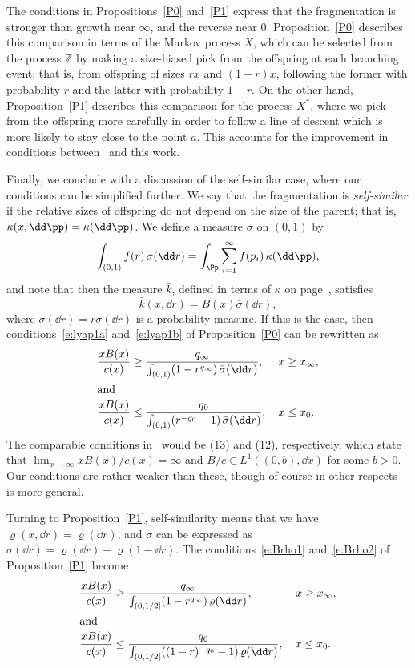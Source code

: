The conditions in Propositions~\ref{P0} and~\ref{P1} express that the fragmentation is stronger than growth near $\infty$, and the reverse near $0$. Proposition~\ref{P0} describes this comparison in terms of the Markov process $X$, which can be selected from the process $\mathbb{Z}$ by making a size-biased pick from the offspring at each branching event; that is, from offspring of sizes $rx$ and $(1-r)x$, following the former with probability $r$ and the latter with probability $1-r$. On the other hand, Proposition~\ref{P1} describes this comparison for the process $X^*$, where we pick from the offspring more carefully in order to follow a line of descent which is more likely to stay close to the point $a$. This accounts for the improvement in conditions between~\cite{BeFK} and this work.

Finally, we conclude with a discussion of the self-similar case, where our conditions can be simplified further. We say that the fragmentation is \emph{self-similar} if the relative sizes of offspring do not depend on the size of the parent; that is, $\kappa(x,\dd \pp) = \kappa(\dd \pp)$. We define a measure $\sigma$ on $(0,1)$ by
\[
\int_{(0,1)} f(r) \, \sigma(\dd r) = \int_{\Pp} \sum_{i=1}^\infty f(p_i) \, \kappa(\dd \pp),
\]
and note that then the measure $\bar{k}$, defined in terms of $\kappa$ on page~\pageref{s:kbar}, satisfies
\[
\bar{k}(x,\dd r) = B(x) \bar{\sigma}(\dd r),
\]
where $\bar{\sigma}(\dd r) = r\sigma(\dd r)$ is a probability measure. If this is the case, then conditions~\eqref{e:lyap1a} and~\eqref{e:lyap1b} of Proposition~\ref{P0} can be rewritten as
\begin{align}
\frac{x B(x)}{c(x)} &\ge \frac{q_\infty}{\int_{(0,1)} (1-r^{q_\infty})\, \bar{\sigma}(\dd r)},
\quad \;x \ge x_\infty,\label{e:Bc10} \\
\intertext{and}
\frac{x B(x)}{c(x)} &\le \frac{q_0}{\int_{(0,1)} (r^{-q_0}-1)\, \bar{\sigma}(\dd r)},
\quad x \le x_0.\label{e:Bc20}
\end{align}
The comparable conditions in~\cite{DoumGab} would be (13) and (12), respectively, which state that $\lim_{x\to\infty}x B(x)/c(x) = \infty$ and $B/c \in L^1((0,b), \dd x)$ for some $b>0$. Our conditions are rather weaker than these, though of course in other respects~\cite{DoumGab} is more general.

Turning to Proposition~\ref{P1}, self-similarity means that we have $\varrho(x,\dd r) = \varrho(\dd r)$, and $\sigma$ can be expressed as $\sigma(\dd r) = \varrho(\dd r) + \varrho(1-\dd r)$. The conditions~\eqref{e:Brho1} and~\eqref{e:Brho2} of Proposition~\ref{P1} become
\begin{align}
\frac{x B(x)}{c(x)} &\ge \frac{q_\infty}{\int_{(0,1/2]} (1-r^{q_\infty})\, \varrho(\dd r)},  \qquad\quad\;\;\; x\ge x_\infty,\label{e:Bc1}\\
\intertext{and}
\frac{x B(x)}{c(x)} &\le \frac{q_0}{\int_{(0,1/2]} ((1-r)^{-q_0}-1)\, \varrho(\dd r)}, \quad x\le x_0.\label{e:Bc2}
\end{align}

